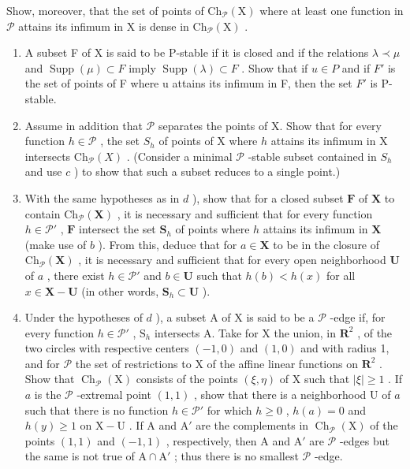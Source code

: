 Show, moreover, that the set of points of \(\mathrm{Ch}_{\mathcal{P}}(\mathrm{X})\) where at least one function in \(\mathcal{P}\) attains its infimum in \(\mathrm{X}\) is dense in \(\mathrm{Ch}_{\mathcal{P}}(\mathrm{X})\) .

\begin{enumerate}
\def\labelenumi{\alph{enumi})}
\setcounter{enumi}{2}
\item
  A subset F of X is said to be P-stable if it is closed and if the relations \(\lambda \prec \mu\) and \(\operatorname{Supp}(\mu) \subset F\) imply \(\operatorname{Supp}(\lambda) \subset F\) . Show that if \(u \in P\) and if \(F'\) is the set of points of F where u attains its infimum in F, then the set \(F'\) is P-stable.
\item
  Assume in addition that \(\mathcal{P}\) separates the points of X. Show that for every function \(h \in \mathcal{P}\) , the set \(S_h\) of points of X where \(h\) attains its infimum in X intersects \(\mathrm{Ch}_{\mathcal{P}}(X)\) . (Consider a minimal \(\mathcal{P}\) -stable subset contained in \(S_h\) and use \(c\) ) to show that such a subset reduces to a single point.)
\item
  With the same hypotheses as in \(d\) ), show that for a closed subset \(\mathbf{F}\) of \(\mathbf{X}\) to contain \(\mathrm{Ch}_{\mathcal{P}}(\mathbf{X})\) , it is necessary and sufficient that for every function \(h \in \mathcal{P}'\) , \(\mathbf{F}\) intersect the set \(\mathbf{S}_h\) of points where \(h\) attains its infimum in \(\mathbf{X}\) (make use of \(b\) ). From this, deduce that for \(a \in \mathbf{X}\) to be in the closure of \(\mathrm{Ch}_{\mathcal{P}}(\mathbf{X})\) , it is necessary and sufficient that for every open neighborhood \(\mathbf{U}\) of \(a\) , there exist \(h \in \mathcal{P}'\) and \(b \in \mathbf{U}\) such that \(h(b) < h(x)\) for all \(x \in \mathbf{X} - \mathbf{U}\) (in other words, \(\mathbf{S}_h \subset \mathbf{U}\) ).
\item
  Under the hypotheses of \(d\) ), a subset A of X is said to be a \(\mathcal{P}\) -edge if, for every function \(h \in \mathcal{P}'\) , \(\mathrm{S}_h\) intersects A. Take for X the union, in \(\mathbf{R}^2\) , of the two circles with respective centers \((-1,0)\) and \((1,0)\) and with radius 1, and for \(\mathcal{P}\) the set of restrictions to X of the affine linear functions on \(\mathbf{R}^2\) . Show that \(\operatorname{Ch}_{\mathcal{P}}(\mathrm{X})\) consists of the points \((\xi, \eta)\) of X such that \(|\xi| \geqslant 1\) . If \(a\) is the \(\mathcal{P}\) -extremal point \((1,1)\) , show that there is a neighborhood U of \(a\) such that there is no function \(h \in \mathcal{P}'\) for which \(h \geqslant 0\) , \(h(a) = 0\) and \(h(y) \geqslant 1\) on \(\mathrm{X} - \mathrm{U}\) . If A and \(\mathrm{A}'\) are the complements in \(\operatorname{Ch}_{\mathcal{P}}(\mathrm{X})\) of the points \((1,1)\) and \((-1,1)\) , respectively, then A and \(\mathrm{A}'\) are \(\mathcal{P}\) -edges but the same is not true of \(\mathrm{A} \cap \mathrm{A}'\) ; thus there is no smallest \(\mathcal{P}\) -edge.
\end{enumerate}


